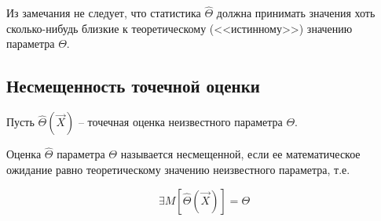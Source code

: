 \begin{note}
    Из замечания не следует, что статистика $\hat \Theta$ должна
    принимать значения хоть сколько-нибудь близкие к теоретическому
    (<<истинному>>) значению параметра $\Theta$.
\end{note}

\subsection{Несмещенность точечной оценки}


\begin{defenition}
    Пусть $\hat \Theta(\vec X)$ -- точечная оценка неизвестного параметра
    $\Theta$.

    Оценка $\hat \Theta$ параметра $\Theta$ называется несмещенной, если
    ее математическое ожидание равно теоретическому значению неизвестного
    параметра, т.е.

    \begin{equation*}
        \exists M[\hat \Theta(\vec X)] = \Theta
    \end{equation*}
\end{defenition}

